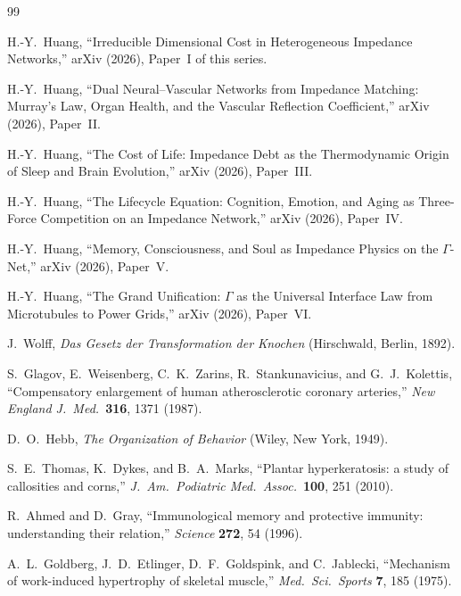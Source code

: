 \documentclass[aps,pre,twocolumn,superscriptaddress,floatfix]{revtex4-2}
\begin{document}
\begin{thebibliography}{99}

H.-Y.~Huang, ``Irreducible Dimensional Cost in Heterogeneous
Impedance Networks,'' arXiv (2026), Paper~I of this series.

H.-Y.~Huang, ``Dual Neural--Vascular Networks from Impedance
Matching: Murray's Law, Organ Health, and the Vascular
Reflection Coefficient,'' arXiv (2026), Paper~II.

H.-Y.~Huang, ``The Cost of Life: Impedance Debt as the
Thermodynamic Origin of Sleep and Brain Evolution,''
arXiv (2026), Paper~III.

H.-Y.~Huang, ``The Lifecycle Equation: Cognition, Emotion,
and Aging as Three-Force Competition on an Impedance Network,''
arXiv (2026), Paper~IV.

H.-Y.~Huang, ``Memory, Consciousness, and Soul as Impedance
Physics on the $\Gamma$-Net,'' arXiv (2026), Paper~V.

H.-Y.~Huang, ``The Grand Unification: $\Gamma$ as the
Universal Interface Law from Microtubules to Power Grids,''
arXiv (2026), Paper~VI.

J.~Wolff, \emph{Das Gesetz der Transformation der Knochen}
(Hirschwald, Berlin, 1892).

S.~Glagov, E.~Weisenberg, C.~K.~Zarins, R.~Stankunavicius,
and G.~J.~Kolettis, ``Compensatory enlargement of human
atherosclerotic coronary arteries,''
\emph{New England J.\ Med.}\ \textbf{316}, 1371 (1987).

D.~O.~Hebb, \emph{The Organization of Behavior}
(Wiley, New York, 1949).

S.~E.~Thomas, K.~Dykes, and B.~A.~Marks,
``Plantar hyperkeratosis: a study of callosities
and corns,'' \emph{J.\ Am.\ Podiatric Med.\ Assoc.}\
\textbf{100}, 251 (2010).

R.~Ahmed and D.~Gray, ``Immunological memory and protective
immunity: understanding their relation,''
\emph{Science} \textbf{272}, 54 (1996).

A.~L.~Goldberg, J.~D.~Etlinger, D.~F.~Goldspink, and
C.~Jablecki, ``Mechanism of work-induced hypertrophy
of skeletal muscle,''
\emph{Med.\ Sci.\ Sports} \textbf{7}, 185 (1975).


\end{thebibliography}
\end{document}
